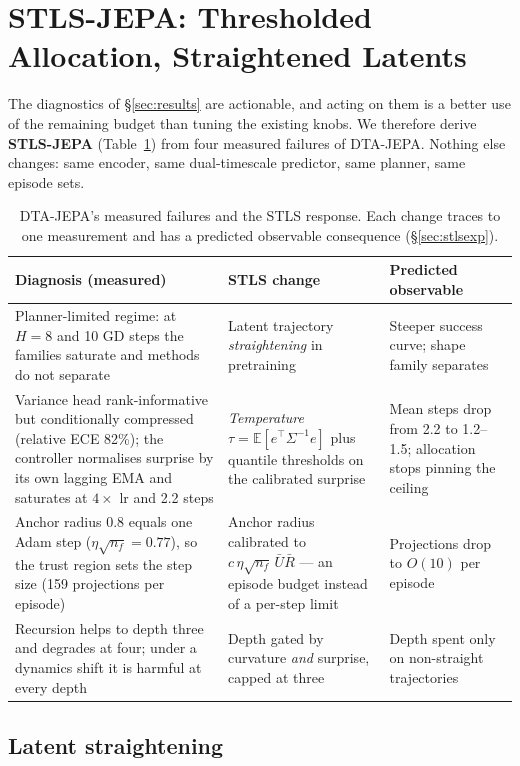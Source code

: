 \section{STLS-JEPA: Thresholded Allocation, Straightened Latents}\label{sec:stls}

The diagnostics of \S\ref{sec:results} are actionable, and acting on them is a better use of the
remaining budget than tuning the existing knobs. We therefore derive \textbf{STLS-JEPA}
(Table~\ref{tab:stls}) from four measured failures of DTA-JEPA. Nothing else changes: same
encoder, same dual-timescale predictor, same planner, same episode sets.

\begin{table}[t]
\centering
\caption{DTA-JEPA's measured failures and the STLS response. Each change traces to one
measurement and has a predicted observable consequence (\S\ref{sec:stlsexp}).}
\label{tab:stls}
\small
\begin{tabular}{p{4.6cm}p{4.6cm}p{4.4cm}}
\toprule
Diagnosis (measured) & STLS change & Predicted observable \\
\midrule
Planner-limited regime: at $H{=}8$ and 10 GD steps the families saturate and methods do not
separate & Latent trajectory \emph{straightening} in pretraining & Steeper success curve; shape
family separates \\
Variance head rank-informative but conditionally compressed (relative ECE 82\%); the controller
normalises surprise by its own lagging EMA and saturates at $4\times$ lr and 2.2 steps &
\emph{Temperature} $\tau=\mathbb E[e^\top\Sigma^{-1}e]$ plus quantile thresholds on the
calibrated surprise & Mean steps drop from 2.2 to 1.2--1.5; allocation stops pinning the ceiling \\
Anchor radius $0.8$ equals one Adam step ($\eta\sqrt{n_f}=0.77$), so the trust region sets the
step size (159 projections per episode) & Anchor radius calibrated to
$c\,\eta\sqrt{n_f}\,\bar U\bar R$ --- an episode budget instead of a per-step limit & Projections
drop to $O(10)$ per episode \\
Recursion helps to depth three and degrades at four; under a dynamics shift it is harmful at
every depth & Depth gated by curvature \emph{and} surprise, capped at three & Depth spent only on
non-straight trajectories \\
\bottomrule
\end{tabular}
\end{table}

\subsection{Latent straightening}


